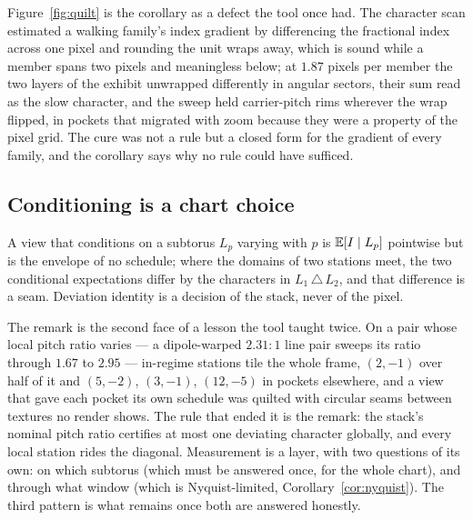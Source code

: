Figure~\ref{fig:quilt} is the corollary as a defect the tool once had. The
character scan estimated a walking family's index gradient by differencing
the fractional index across one pixel and rounding the unit wraps away, which
is sound while a member spans two pixels and meaningless below; at $1.87$
pixels per member the two layers of the exhibit unwrapped differently in
angular sectors, their sum read as the slow character, and the sweep held
carrier-pitch rims wherever the wrap flipped, in pockets that migrated with
zoom because they were a property of the pixel grid. The cure was not a rule
but a closed form for the gradient of every family, and the corollary says why
no rule could have sufficed.

\subsection{Conditioning is a chart choice}
\label{sec:licence}

\begin{remark}
\label{rem:licence}
A view that conditions on a subtorus $L_p$ varying with $p$ is $\mathbb{E}[I\mid L_p]$
pointwise but is the envelope of no schedule; where the domains of two
stations meet, the two conditional expectations differ by the characters in
$L_1\,\triangle\,L_2$, and that difference is a seam. Deviation identity is a
decision of the stack, never of the pixel.
\end{remark}

The remark is the second face of a lesson the tool taught twice. On a pair
whose local pitch ratio varies --- a dipole-warped $2.31{:}1$ line pair sweeps
its ratio through $1.67$ to $2.95$ --- in-regime stations tile the whole
frame, $(2,-1)$ over half of it and $(5,-2)$, $(3,-1)$, $(12,-5)$ in pockets
elsewhere, and a view that gave each pocket its own schedule was quilted with
circular seams between textures no render shows. The rule that ended it is the
remark: the stack's nominal pitch ratio certifies at most one deviating
character globally, and every local station rides the diagonal. Measurement is
a layer, with two questions of its own: on which subtorus (which must be
answered once, for the whole chart), and through what window (which is
Nyquist-limited, Corollary~\ref{cor:nyquist}). The third pattern is what
remains once both are answered honestly.
